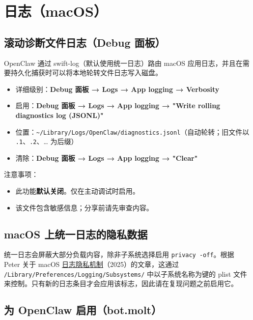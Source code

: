 \clearpage

\section{日志（macOS）}


\subsection{滚动诊断文件日志（Debug 面板）}


OpenClaw 通过 swift-log（默认使用统一日志）路由 macOS 应用日志，并且在需要持久化捕获时可以将本地轮转文件日志写入磁盘。

\begin{itemize}
  \item 详细级别：\textbf{Debug 面板 → Logs → App logging → Verbosity}
  \item 启用：\textbf{Debug 面板 → Logs → App logging → "Write rolling diagnostics log (JSONL)"}
  \item 位置：\texttt{\textasciitilde{}/Library/Logs/OpenClaw/diagnostics.jsonl}（自动轮转；旧文件以 \texttt{.1}、\texttt{.2}、… 为后缀）
  \item 清除：\textbf{Debug 面板 → Logs → App logging → "Clear"}
\end{itemize}


注意事项：

\begin{itemize}
  \item 此功能\textbf{默认关闭}。仅在主动调试时启用。
  \item 该文件包含敏感信息；分享前请先审查内容。
\end{itemize}


\subsection{macOS 上统一日志的隐私数据}


统一日志会屏蔽大部分负载内容，除非子系统选择启用 \texttt{privacy -off}。根据 Peter 关于 macOS \href{https://steipete.me/posts/2025/logging-privacy-shenanigans}{日志隐私机制}（2025）的文章，这通过 \texttt{/Library/Preferences/Logging/Subsystems/} 中以子系统名称为键的 plist 文件来控制。只有新的日志条目才会应用该标志，因此请在复现问题之前启用它。

\subsection{为 OpenClaw 启用（bot.molt）}


